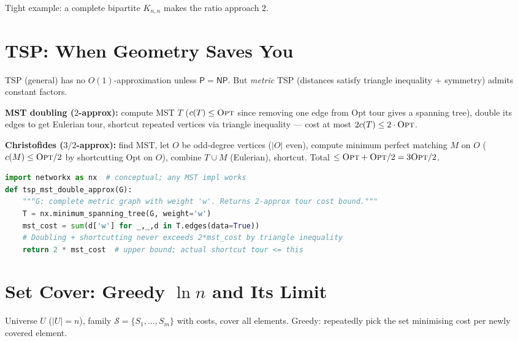 Tight example: a complete bipartite $K_{n,n}$ makes the ratio approach $2$.

\section{TSP: When Geometry Saves You}
\label{sec:tsp}

\textsc{TSP} (general) has no $O(1)$-approximation unless $\mathsf{P}=\mathsf{NP}$. But \emph{metric} TSP (distances satisfy triangle inequality + symmetry) admits constant factors.

\textbf{MST doubling ($2$-approx):} compute MST $T$ ($c(T)\le\textsc{Opt}$ since removing one edge from Opt tour gives a spanning tree), double its edges to get Eulerian tour, shortcut repeated vertices via triangle inequality --- cost at most $2c(T)\le 2\cdot\textsc{Opt}$.

\textbf{Christofides ($3/2$-approx):} find MST, let $O$ be odd-degree vertices ($|O|$ even), compute minimum perfect matching $M$ on $O$ ($c(M)\le\textsc{Opt}/2$ by shortcutting Opt on $O$), combine $T\cup M$ (Eulerian), shortcut. Total $\le\textsc{Opt}+\textsc{Opt}/2=3\textsc{Opt}/2$.

\begin{lstlisting}[language=Python]
import networkx as nx  # conceptual; any MST impl works
def tsp_mst_double_approx(G):
    """G: complete metric graph with weight 'w'. Returns 2-approx tour cost bound."""
    T = nx.minimum_spanning_tree(G, weight='w')
    mst_cost = sum(d['w'] for _,_,d in T.edges(data=True))
    # Doubling + shortcutting never exceeds 2*mst_cost by triangle inequality
    return 2 * mst_cost  # upper bound; actual shortcut tour <= this
\end{lstlisting}

\section{\texorpdfstring{Set Cover: Greedy $\ln n$ and Its Limit}{Set Cover: Greedy ln n and Its Limit}}
\label{sec:set-cover}

Universe $U$ ($|U|=n$), family $\mathcal{S}=\{S_1,\dots,S_m\}$ with costs, cover all elements. Greedy: repeatedly pick the set minimising cost per newly covered element.

